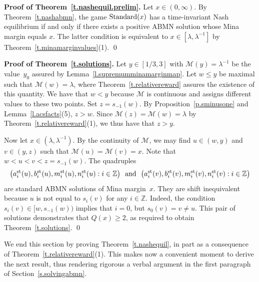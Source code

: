 \documentclass[letterpaper,11pt,oneside,reqno]{amsbook}
\newcommand{\Z}{\ensuremath{\mathbb{Z}}}
\numberwithin{figure}{chapter}
\theoremstyle{definition}
\theoremstyle{definition}
\theoremstyle{definition}
\theoremstyle{definition}
\theoremstyle{definition}
\newcommand{\standard}{{\rm Standard}}
\newcommand{\asta}{a^{\rm st}}
\newcommand{\bst}{b^{\rm st}}
\newcommand{\mst}{m^{\rm st}}
\newcommand{\nst}{n^{\rm st}}
\newcommand{\minamm}{\mathcal{M}}
\newcommand{\abmnmacspace}{\textrm{ABMN} }
\begin{document}
{\bf Proof of Theorem~\ref{t.nashequil.prelim}.}
Let $x \in (0,\infty)$. By Theorem~\ref{t.nashabmn}, the game $\standard(x)$ has a time-invariant Nash equilibrium if and only if there exists a positive \abmnmacspace solution whose Mina margin equals $x$.
The latter condition is equivalent to $x \in [\lambda,\lambda^{-1}]$ by Theorem~\ref{t.minamarginvalues}(1). \qed

{\bf Proof of Theorem~\ref{t.solutions}.}
Let $y \in [1/3,3]$ with $\minamm(y) = \lambda^{-1}$ be the value~$y_0$ assured by Lemma~\ref{l.supremumminamarginmap}. Let $w \leq y$ be maximal such that $\minamm(w) = \lambda$, where Theorem~\ref{t.relativereward} assures the existence of this quantity. We have that $w < y$
because $\minamm$ is continuous and assigns different values to these two points.
Set $z = s_{-1}(w)$. By Proposition~\ref{p.sminusone} and Lemma~\ref{l.acsfacts}(5), $z > w$. Since $\minamm(z) = \minamm(w) = \lambda$ by Theorem~\ref{t.relativereward}(1), we thus have that $z > y$.

Now let $x \in (\lambda,\lambda^{-1})$. By the continuity of $\minamm$, we may find $u \in (w,y)$ and $v \in (y,z)$ such that $\minamm(u) = \minamm(v) =x$. Note that $w < u < v < z = s_{-1}(w)$.
The quadruples 
$$
\big(\asta_i(u),\bst_i(u),\mst_i(u),\nst_i(u)  : i \in \Z  \big) \, \, \, \, \textrm{and} \, \, \, \,   \big(\asta_i(v),\bst_i(v),\mst_i(v),\nst_i(v)  : i \in \Z  \big)
$$  
are standard \abmnmacspace solutions of Mina margin~$x$. They are shift inequivalent because $u$ is not equal to $s_i(v)$ for any $i \in \Z$. Indeed, the condition $s_i(v) \in [w,s_{-1}(w))$ implies that $i =0$, but $s_0(v) = v \not= u$. This pair of solutions demonstrates that $Q(x) \geq 2$, as required to obtain Theorem~\ref{t.solutions}. \qed

We end this section by proving Theorem~\ref{t.nashequil}, in part as a consequence of Theorem~\ref{t.relativereward}(1). 
This makes now a convenient moment to derive the next result, thus rendering rigorous a verbal argument in the first paragraph of Section~\ref{s.solvingabmn}.
  
\end{document}
